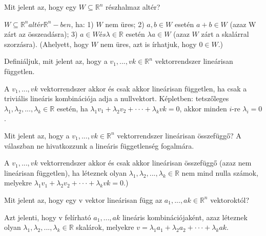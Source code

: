 \begin{frame}
  \begin{tcolorbox}[title={1}]
      Mit jelent az, hogy egy $W {\subseteq} \mathbb{R}^n$ részhalmaz altér?

  \tcblower
$W {\subseteq} \mathbb{R}^n altér \mathbb{R}^n-ben$, ha: 1) $W$ nem üres; 2) $a,b \in W$ esetén $a + b \in W$ (azaz W zárt az összeadásra); 3) $a \in W és {\lambda} \in \mathbb{R}$ esetén ${\lambda}a \in W$ (azaz $W$ zárt a skalárral szorzásra). (Ahelyett, hogy $W$ nem üres, azt is írhatjuk, hogy $0 \in W$.)
  \end{tcolorbox}
\end{frame}


\begin{frame}
  \begin{tcolorbox}[title={2}]
      Definiáljuk, mit jelent az, hogy a $v_1,...,vk \in \mathbb{R}^n$ vektorrendszer lineárisan független.

  \tcblower
A $v_1,...,vk$ vektorrendszer akkor és csak akkor lineárisan független, ha csak a triviális lineáris kombinációja adja a nullvektort. Képletben: tetszőleges ${\lambda}_1,{\lambda}_2,...,{\lambda}_k \in \mathbb{R}$ esetén, ha ${\lambda}_1v_1 + {\lambda}_2v_2 +  \cdot  \cdot  \cdot  + {\lambda}_kvk = 0$, akkor minden $i$-re ${\lambda}_i = 0$.
  \end{tcolorbox}
\end{frame}


\begin{frame}
  \begin{tcolorbox}[title={3}]
      Mit jelent az, hogy a $v_1,...,vk \in \mathbb{R}^n$ vektorrendszer lineárisan összefüggő? A válaszban ne hivatkozzunk a lineáris függetlenség fogalmára.


  \tcblower
A $v_1,...,vk$ vektorrendszer akkor és csak akkor lineárisan összefüggő (azaz nem lineárisan független), ha léteznek olyan ${\lambda}_1,{\lambda}_2,...,{\lambda}_k \in \mathbb{R}$ nem mind nulla számok, melyekre ${\lambda}_1v_1 + {\lambda}_2v_2 +  \cdot  \cdot  \cdot  + {\lambda}_kvk = 0$.)

  \end{tcolorbox}
\end{frame}

\begin{frame}
  \begin{tcolorbox}[title={4}]
     Mit jelent az, hogy egy v vektor lineárisan függ az $a_1,...,ak \in \mathbb{R}^n$ vektoroktól?

  \tcblower
Azt jelenti, hogy v felírható $a_1,...,ak$ lineáris kombinációjaként, azaz léteznek olyan ${\lambda}_1,{\lambda}_2,...,{\lambda}_k \in \mathbb{R}$ skalárok, melyekre $v = {\lambda}_1a_1 + {\lambda}_2a_2 +  \cdot  \cdot  \cdot  + {\lambda}_kak$.
  \end{tcolorbox}
\end{frame}


